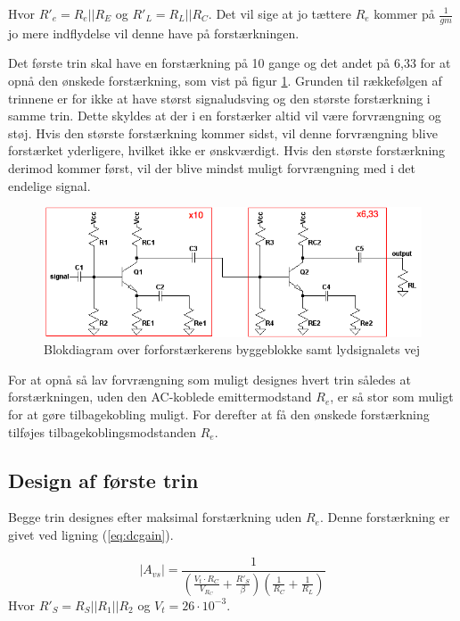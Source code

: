 Hvor $R'_e = R_e || R_E$ og $R'_L = R_L||R_C$. Det vil sige at jo tættere $R_e$ kommer på $\frac{1}{gm}$ jo mere indflydelse vil denne have på forstærkningen.

Det første trin skal have en forstærkning på 10 gange og det andet på 6,33 for at opnå den ønskede forstærkning, som vist på figur \ref{blok_forforstaerker}. Grunden til rækkefølgen af trinnene er for ikke at have størst signaludsving og den største forstærkning i samme trin. Dette skyldes at der i en forstærker altid vil være forvrængning og støj. Hvis den største forstærkning kommer sidst, vil denne forvrængning blive forstærket yderligere, hvilket ikke er ønskværdigt. Hvis den største forstærkning derimod kommer først, vil der blive mindst muligt forvrængning med i det endelige signal.

\begin{figure}[h]
\centering
\includegraphics[scale=.6]{teknisk/forforstaerker/blok_forforstaerker.png}
\caption{Blokdiagram over forforstærkerens byggeblokke samt lydsignalets vej}
\label{blok_forforstaerker}
\end{figure}

For at opnå så lav forvrængning som muligt designes hvert trin således at forstærkningen, uden den AC-koblede emittermodstand $R_e$, er så stor som muligt for at gøre tilbagekobling muligt. For derefter at få den ønskede forstærkning tilføjes tilbagekoblingsmodstanden $R_e$.

\subsection*{Design af første trin}
Begge trin designes efter maksimal forstærkning uden $R_e$. Denne forstærkning er givet ved ligning (\ref{eq:dcgain}).

\begin{equation}
|A_{vs}|=\frac{1}{\left(\frac{V_t \cdot R_C}{V_{R_C}}+\frac{R'_S}{\beta}\right) \left(\frac{1}{R_C}+\frac{1}{R_L}\right)}
\label{eq:dcgain}
\end{equation}
Hvor $R'_S = R_S||R_1||R_2$ og $V_t = 26 \cdot 10^{-3}$.

